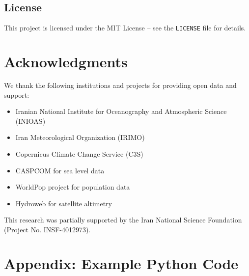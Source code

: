 \documentclass[12pt,a4paper]{article}
\begin{document}
\subsection{License}
This project is licensed under the MIT License – see the \texttt{LICENSE} file for details.

\section{Acknowledgments}
We thank the following institutions and projects for providing open data and support:
\begin{itemize}
    \item Iranian National Institute for Oceanography and Atmospheric Science (INIOAS)
    \item Iran Meteorological Organization (IRIMO)
    \item Copernicus Climate Change Service (C3S)
    \item CASPCOM for sea level data
    \item WorldPop project for population data
    \item Hydroweb for satellite altimetry
\end{itemize}
This research was partially supported by the Iran National Science Foundation (Project No. INSF-4012973).

\appendix
\section{Appendix: Example Python Code}
\end{document}
